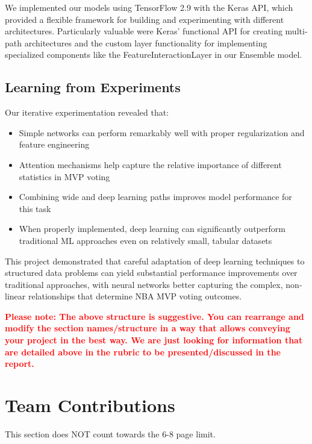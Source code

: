 \documentclass[10pt,twocolumn,letterpaper]{article}
\begin{document}
We implemented our models using TensorFlow 2.9 with the Keras API, which provided a flexible framework for building and experimenting with different architectures. Particularly valuable were Keras' functional API for creating multi-path architectures and the custom layer functionality for implementing specialized components like the FeatureInteractionLayer in our Ensemble model.

\subsection{Learning from Experiments}

Our iterative experimentation revealed that:

\begin{itemize}
    \item Simple networks can perform remarkably well with proper regularization and feature engineering
    \item Attention mechanisms help capture the relative importance of different statistics in MVP voting
    \item Combining wide and deep learning paths improves model performance for this task
    \item When properly implemented, deep learning can significantly outperform traditional ML approaches even on relatively small, tabular datasets
\end{itemize}

This project demonstrated that careful adaptation of deep learning techniques to structured data problems can yield substantial performance improvements over traditional approaches, with neural networks better capturing the complex, non-linear relationships that determine NBA MVP voting outcomes.


\textbf{\textcolor{red}{Please note: The above structure is suggestive. You can rearrange and modify the section names/structure in a way that allows conveying your project in the best way. We are just looking for information that are detailed above in the rubric to be presented/discussed in the report.}}

\section{Team Contributions}
This section does NOT count towards the 6-8 page limit.
\end{document}
